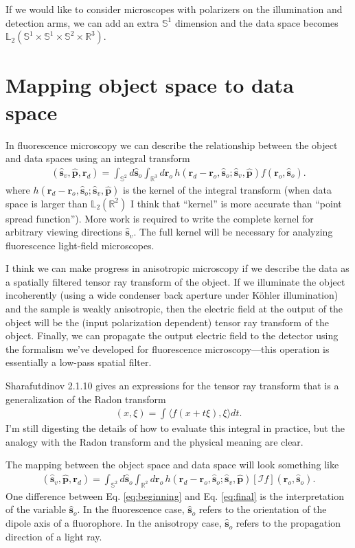 \documentclass[11pt]{article}
\providecommand{\mb}[1]{\mathbf{#1}}
\providecommand{\ro}[1]{\mathbf{\mathbf{r}}_o}
\providecommand{\so}[1]{\mathbf{\hat{s}}_o}
\providecommand{\rd}[1]{\mathbf{r}_d}
\providecommand{\mbb}[1]{\mathbb{#1}}
\begin{document}
If we would like to consider microscopes with polarizers on the illumination and
detection arms, we can add an extra $\mbb{S}^1$ dimension and the data space
becomes $\mbb{L}_2(\mbb{S}^1\times\mbb{S}^1\times\mbb{S}^2\times\mbb{R}^3)$.

\section{Mapping object space to data space}
In fluorescence microscopy we can describe the relationship between the object
and data spaces using an integral transform
\begin{align}
    [\mathcal{H}f](\hat{\mb{s}}_v, \hat{\mb{p}}, \rd{}) = \int_{\mbb{S}^2}d\so{}\int_{\mbb{R}^3}d\ro{}\, h(\rd{} -\ro{}, \so{}; \hat{\mb{s}}_v, \hat{\mb{p}})f(\ro{}, \so{}).\label{eq:beginning}
\end{align}
where $h(\rd{} -\ro{}, \so{}; \hat{\mb{s}}_v, \hat{\mb{p}})$ is the kernel of
the integral transform (when data space is larger than $\mbb{L}_2(\mbb{R}^2)$ I
think that ``kernel'' is more accurate than ``point spread function''). More
work is required to write the complete kernel for arbitrary viewing directions $\hat{\mb{s}}_v$.
The full kernel will be necessary for analyzing fluorescence light-field
microscopes.

I think we can make progress in anisotropic microscopy if we describe the
data as a spatially filtered tensor ray transform of the object. If we
illuminate the object incoherently (using a wide condenser back aperture under
K\"ohler illumination) and the sample is weakly anisotropic, then the electric
field at the output of the object will be the (input polarization dependent)
tensor ray transform of the object. Finally, we can propagate the output
electric field to the detector using the formalism we've developed for
fluorescence microscopy---this operation is essentially a low-pass spatial
filter.

Sharafutdinov 2.1.10 \cite{shara1994} gives an expressions for the tensor ray
transform that is a generalization of the Radon transform
\begin{align}
  [\mathcal{I}f](x, \xi) = \int \langle f(x + t\xi), \xi\rangle dt. 
\end{align}
I'm still digesting the details of how to evaluate this integral in practice,
but the analogy with the Radon transform and the physical meaning are clear.

The mapping between the object space and data space will look something like
\begin{align}
    [\mathcal{H}f](\hat{\mb{s}}_v, \hat{\mb{p}}, \rd{}) = \int_{\mbb{S}^2}d\so{}\int_{\mbb{R}^2}d\ro{}\, h(\rd{} -\ro{}, \so{}; \hat{\mb{s}}_v, \hat{\mb{p}})[\mathcal{I}f](\ro{}, \so{}).\label{eq:final}
\end{align}
One difference between Eq. \ref{eq:beginning} and Eq. \ref{eq:final} is the
interpretation of the variable $\so{}$. In the fluorescence case, $\so{}$ refers
to the orientation of the dipole axis of a fluorophore. In the anisotropy case,
$\so{}$ refers to the propagation direction of a light ray.
\end{document}
